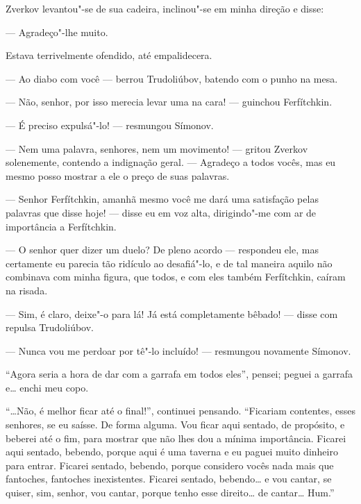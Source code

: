 Zverkov levantou"-se de sua cadeira, inclinou"-se em minha direção e
disse:

--- Agradeço"-lhe muito.

Estava terrivelmente ofendido, até empalidecera.

--- Ao diabo com você --- berrou Trudoliúbov, batendo com o punho na mesa.

--- Não, senhor, por isso merecia levar uma na cara! --- guinchou
Ferfítchkin.

--- É preciso expulsá"-lo! --- resmungou Símonov.

--- Nem uma palavra, senhores, nem um movimento! --- gritou Zverkov
solenemente, contendo a indignação geral. --- Agradeço a todos vocês, mas
eu mesmo posso mostrar a ele o preço de suas palavras.

--- Senhor Ferfítchkin, amanhã mesmo você me dará uma satisfação pelas
palavras que disse hoje! --- disse eu em voz alta, dirigindo"-me com ar de
importância a Ferfítchkin.

--- O senhor quer dizer um duelo? De pleno acordo --- respondeu ele, mas
certamente eu parecia tão ridículo ao desafiá"-lo, e de tal maneira
aquilo não combinava com minha figura, que todos, e com eles também
Ferfítchkin, caíram na risada.

--- Sim, é claro, deixe"-o para lá! Já está completamente bêbado! --- disse
com repulsa Trudoliúbov.

--- Nunca vou me perdoar por tê"-lo incluído! --- resmungou novamente
Símonov.

“Agora seria a hora de dar com a garrafa em todos eles”, pensei; peguei
a garrafa e\ldots{} enchi meu copo.

“\ldots{}Não, é melhor ficar até o final!”, continuei pensando. “Ficariam
contentes, esses senhores, se eu saísse. De forma alguma. Vou ficar
aqui sentado, de propósito, e beberei até o fim, para mostrar que não
lhes dou a mínima importância. Ficarei aqui sentado, bebendo, porque
aqui é uma taverna e eu paguei muito dinheiro para entrar. Ficarei
sentado, bebendo, porque considero vocês nada mais que fantoches,
fantoches inexistentes. Ficarei sentado, bebendo\ldots{} e vou cantar, se
quiser, sim, senhor, vou cantar, porque tenho esse direito\ldots{} de
cantar\ldots{} Hum.”

